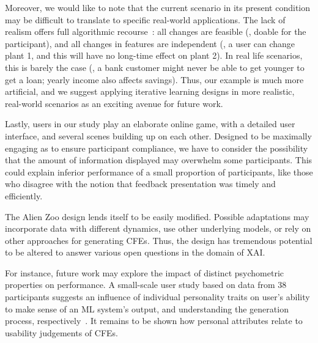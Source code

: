 Moreover, we would like to note that the current scenario in its present condition may be difficult to translate to specific real-world applications.
The lack of realism offers full algorithmic recourse~\citep{karimi_survey_2020}: all changes are feasible (\ie, doable for the participant), and all changes in features are independent (\ie, a user can change plant 1, and this will have no long-time effect on plant 2).
In real life scenarios, this is barely the case (\eg, a bank customer might never be able to get younger to get a loan; yearly income also affects savings). 
Thus, our example is much more artificial, and we suggest applying iterative learning designs in more realistic, real-world scenarios as an exciting avenue for future work.

Lastly, users in our study play an elaborate online game, with a detailed user interface, and several scenes building up on each other.
Designed to be maximally engaging as to ensure participant compliance, we have to consider the possibility that the amount of information displayed may overwhelm some participants.
This could explain inferior performance of a small proportion of participants, like those who disagree with the notion that feedback presentation was timely and efficiently.

The Alien Zoo design lends itself to be easily modified. 
Possible adaptations may incorporate data with different dynamics, use other underlying models, or rely on other approaches for generating \glspl{CFE}.
Thus, the design has tremendous potential to be altered to answer various open questions in the domain of \gls{XAI}.

For instance, future work may explore the impact of distinct psychometric properties on performance. 
A small-scale user study based on data from 38 participants suggests an influence of individual personality traits on user's ability to make sense of an \gls{ML} system's output, and understanding the generation process, respectively~\citep{gleaves_role_2020}.
It remains to be shown how personal attributes relate to usability judgements of \glspl{CFE}.

